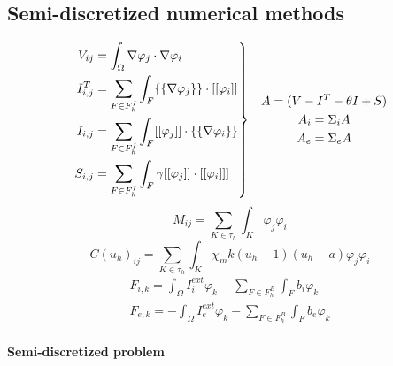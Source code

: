 \documentclass[a4paper]{article}
\newenvironment{rcases}
{\left.\begin{aligned}}
	{\end{aligned}\right\rbrace}
\begin{document}
\vspace{5mm}

\subsection{Semi-discretized numerical methods}

\vspace{5mm}
\begin{equation}
\begin{rcases}
V_{ij} &= \int_{\Omega}\nabla\varphi_j \cdot \nabla \varphi_i 
\\ I_{i,j}^T &= \sum_{F \in F_h^I} \int_{F} \{\{\nabla\varphi_j\}\} \cdot [[\varphi_i]] 
\\ I_{i,j} &= \sum_{F \in F_h^I} \int_{F} [[\varphi_j]] \cdot \{\{\nabla \varphi_i\}\}
\\S_{i,j} &= \sum_{F \in F_h^I} \int_{F} \gamma [[\varphi_j]] \cdot [[\varphi_i]]]
\end{rcases}
\begin{gathered}
\quad A = (V -I^T - \theta I + S)\\
\quad A_i = \Sigma_iA \\
\quad A_e = \Sigma_eA
\end{gathered}
\end{equation}
\begin{equation}
M_{ij} = \sum_{K \in \tau_h}\int_K
\varphi_j\varphi_i
\end{equation}
\begin{equation}
C(u_h)_{ij} =  \sum_{K \in \tau_h} \int_K \chi_m k(u_h-1)(u_h-a)\varphi_j\varphi_i
\end{equation}
\begin{equation}
\begin{gathered}
F_{i,k} = \int_{\Omega} I_i^{ext}\varphi_k - \sum_{F \in F_h^B} \int_F b_i\varphi_k
\\
F_{e,k} = - \int_{\Omega} I_e^{ext}\varphi_k - \sum_{F \in F_h^B} \int_F b_e\varphi_k
\end{gathered}
\end{equation}


	\vspace{3mm}
\paragraph{Semi-discretized problem} 
\end{document}
